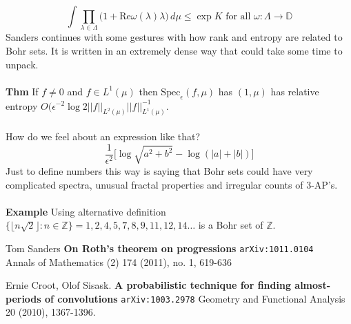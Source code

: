 \documentclass[12pt]{article}
\begin{document}
$$ \int \prod_{\lambda \in \Lambda} \big( 1 + \text{Re}\omega(\lambda) \lambda \big) \, d\mu \leq \exp{K} \text{ for all } \omega: \Lambda \to \mathbb{D}$$ 
Sanders continues with some gestures with how rank and entropy are related to Bohr sets.  It is written in an extremely dense way that could take some time to unpack. \\ \\
\textbf{Thm} If $f \neq 0$ and $f \in L^1(\mu)$ then $\text{Spec}_\epsilon(f, \mu)$ has $(1, \mu)$ has relative entropy $O(\epsilon^{-2} \log 2 ||f||_{L^2(\mu)} ||f||_{L^1(\mu)}^{-1} $. \\ \\
How do we feel about an expression like that?
$$ \frac{1}{\epsilon^2} \Big[\log \sqrt{a^2 + b^2 } - \log(|a| + |b|) \Big] $$
Just to define numbers this way is saying that Bohr sets could have very complicated spectra, unusual fractal properties and irregular counts of 3-AP's. \\ \\
\textbf{Example} Using alternative definition $\{ \lfloor n \sqrt{2} \rfloor : n \in \mathbb{Z}  \} = 1, 2, 4, 5, 7, 8, 9, 11, 12, 14\dots$ is a Bohr set of $\mathbb{Z}$.
\vfill
\begin{thebibliography}{}

\item Tom Sanders \textbf{On Roth's theorem on progressions} \texttt{arXiv:1011.0104} \\
Annals of Mathematics (2) 174 (2011), no. 1, 619-636

\item Ernie Croot, Olof Sisask. \textbf{A probabilistic technique for finding almost-periods of convolutions} \texttt{arXiv:1003.2978} Geometry and Functional Analysis 20 (2010), 1367-1396.

\end{thebibliography}
\end{document}
